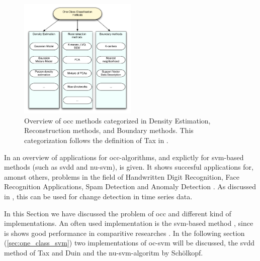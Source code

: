 \begin{figure}
  \centering
    \includegraphics[width=0.5\textwidth,keepaspectratio]{./Figures/chapter3/occ_methods.pdf}
  \caption[\gls{occ} methods]{Overview of \gls{occ} methods categorized in Density Estimation, Reconstruction methods, and Boundary methods. This categorization follows the definition of Tax in \cite{tax2001one}.}
  \label{fig:occ-methods}
\end{figure}

In \cite{khan2010survey,noumir2012simple} an overview of applications for \gls{occ}-algorithms, and explictly for \gls{svm}-based methods (such as \gls{svdd} and \gls{nu-svm}), is given.
It shows succesful applications for, amonst others, problems in the field of Handwritten Digit Recognition, Face Recognition Applications, Spam Detection and Anomaly Detection \cite{li2003improving,perdisci2006using}.
As discussed in , this can be used for change detection in time series data.

In this Section we have discussed the problem of \gls{occ} and different kind of implementations.
An often used implementation is the \gls{svm}-based method \cite{noumir2012simple}, since is shows good performance in comparitive researches \cite{khan2010survey,smola1998connection}.
In the following section (\ref{sec:one_class_svm}) two implementations of \gls{oc-svm} will be discussed, the \gls{svdd} method of Tax and Duin \cite{tax1999support} and the \gls{nu-svm}-algoritm by Sch\"olkopf.






